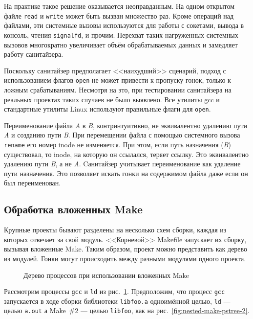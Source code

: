 На практике такое решение оказывается неоправданным. На одном открытом файле \texttt{read} и \texttt{write} может быть вызван множество раз. Кроме операций над файлами, эти системные вызовы используются для работы с сокетами, вывода в консоль, чтения \texttt{signalfd}, и прочим. Перехват таких нагруженных системных вызовов многократно увеличивает объём обрабатываемых данных и замедляет работу санитайзера.

Поскольку санитайзер предполагает <<наихудший>> сценарий, подход с использованием флагов \texttt{open} не может привести к пропуску гонок, только к ложным срабатываниям. Несмотря на это, при тестировании санитайзера на реальных проектах таких случаев не было выявлено. Все утилиты gcc и стандартные утилиты Linux используют правильные флаги для \texttt{open}.

Переименование файла \textit{A} в \textit{B}, контринтуитивно, не эквивалентно удалению пути \textit{A} и созданию пути \textit{B}. При перемещении файла с помощью системного вызова \texttt{rename} его номер inode не изменяется. При этом, если путь назначения (\textit{B}) существовал, то inode, на которую он ссылался, теряет ссылку. Это эквивалентно удалению пути \textit{B}, а не \textit{A}. Cанитайзер учитывает переименование как удаление пути назначения. Это позволяет искать гонки на содержимом файла даже если он был переименован.

\subsection{Обработка вложенных Make}
\label{subsec:nested-make}

Крупные проекты бывают разделены на несколько схем сборки, каждая из которых отвечает за свой модуль. <<Корневой>> Makefile запускает их сборку, вызывая вложенные Make. Таким образом, проект можно представить как дерево из модулей. Гонки могут происходить между разными модулями одного проекта.

\begin{figure}[H]
    \centering
    
    \caption{Дерево процессов при использовании вложенных Make}
    \label{fig:nested-make-pstree}
\end{figure}

Рассмотрим процессы \texttt{gcc} и \texttt{ld} из рис.~\ref{fig:nested-make-pstree}. Предположим, что процесс \texttt{gcc} запускается в ходе сборки библиотеки \texttt{libfoo.a} одноимённой целью, \texttt{ld} --- целью \texttt{a.out} а Make~\#2 --- целью \texttt{libfoo}, как на рис.~\ref{fig:nested-make-pstree-2}.

